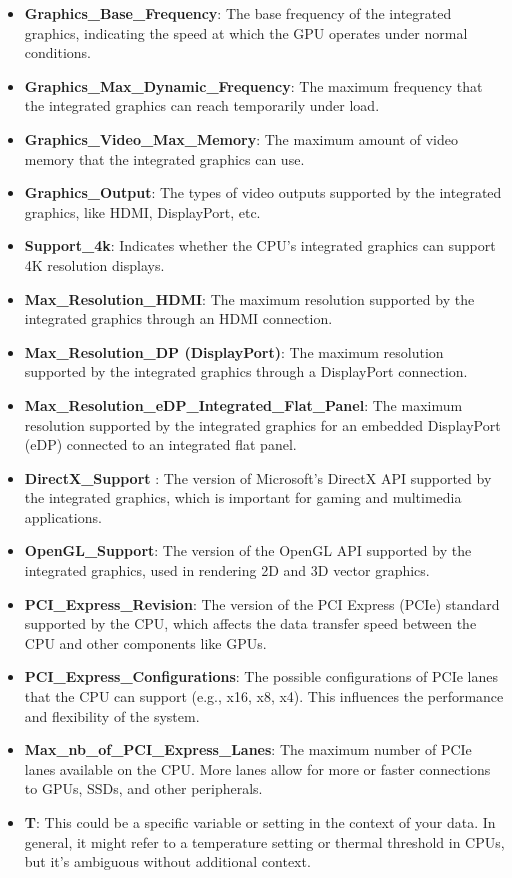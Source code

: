 \documentclass{article}
\begin{document}
\begin{itemize}
		\item \textbf{Graphics\_Base\_Frequency}: The base frequency of the integrated graphics, indicating the speed at which the GPU operates under normal conditions.
		\item \textbf{Graphics\_Max\_Dynamic\_Frequency}: The maximum frequency that the integrated graphics can reach temporarily under load.
		\item \textbf{Graphics\_Video\_Max\_Memory}: The maximum amount of video memory that the integrated graphics can use.
		\item \textbf{Graphics\_Output}: The types of video outputs supported by the integrated graphics, like HDMI, DisplayPort, etc.
		\item \textbf{ Support\_4k}: Indicates whether the CPU’s integrated graphics can support 4K resolution displays.
		\item \textbf{ Max\_Resolution\_HDMI}: The maximum resolution supported by the integrated graphics through an HDMI connection.
		\item \textbf{Max\_Resolution\_DP (DisplayPort)}: The maximum resolution supported by the integrated graphics through a DisplayPort connection.
		\item \textbf{Max\_Resolution\_eDP\_Integrated\_Flat\_Panel}: The maximum resolution supported by the integrated graphics for an embedded DisplayPort (eDP) connected to an integrated flat panel.
		\item \textbf{DirectX\_Support
		}: The version of Microsoft’s DirectX API supported by the integrated graphics, which is important for gaming and multimedia applications.
		\item \textbf{OpenGL\_Support}: The version of the OpenGL API supported by the integrated graphics, used in rendering 2D and 3D vector graphics.
		\item \textbf{PCI\_Express\_Revision}: The version of the PCI Express (PCIe) standard supported by the CPU, which affects the data transfer speed between the CPU and other components like GPUs.
		\item \textbf{PCI\_Express\_Configurations}: The possible configurations of PCIe lanes that the CPU can support (e.g., x16, x8, x4). This influences the performance and flexibility of the system.
		\item \textbf{Max\_nb\_of\_PCI\_Express\_Lanes}: The maximum number of PCIe lanes available on the CPU. More lanes allow for more or faster connections to GPUs, SSDs, and other peripherals.
		\item \textbf{T}: This could be a specific variable or setting in the context of your data. In general, it might refer to a temperature setting or thermal threshold in CPUs, but it’s ambiguous without additional context.

\end{itemize}
\end{document}
